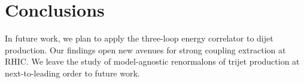 \section{Conclusions}\label{sec:conclusions}

In future work, we plan to apply the three-loop energy correlator to
dijet production. Our findings open new avenues for strong coupling
extraction at RHIC. We leave the study of model-agnostic renormalons of
trijet production at next-to-leading order to future work.

